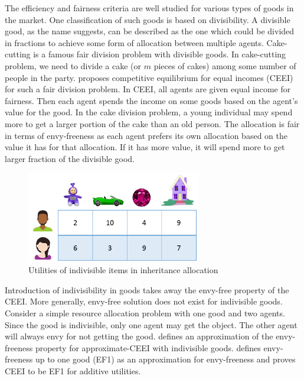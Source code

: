 The efficiency and fairness criteria are well studied for various types of goods in the market. One classification of such goods is based on divisibility. A divisible good, as the name suggests, can be described as the one which could be divided in fractions to achieve some form of allocation between multiple agents. Cake-cutting is a famous fair division problem with divisible goods. In cake-cutting problem, we need to divide a cake (or $m$ pieces of cakes) among some number of people in the party. \cite{varian1973equity} proposes competitive equilibrium for equal incomes (CEEI) for such a fair division problem. In CEEI, all agents are given equal income for fairness. Then each agent spends the income on some goods based on the agent's value for the good. In the cake division problem, a young individual may spend more to get a larger portion of the cake than an old person. The allocation is fair in terms of envy-freeness as each agent prefers its own allocation based on the value it has for that allocation. If it has more value, it will spend more to get larger fraction of the divisible good.

\begin{figure}
\includegraphics[width=3in]{images/indivisible_allocation2x4.png}
\caption{Utilities of indivisible items in inheritance allocation}
\end{figure}

Introduction of indivisibility in goods takes away the envy-free property of the CEEI. More generally, envy-free solution does not exist for indivisible goods. Consider a simple resource allocation problem with one good and two agents. Since the good is indivisible, only one agent may get the object. The other agent will always envy for not getting the good. \cite{budish2011combinatorial} defines an approximation of the envy-freeness property for approximate-CEEI with indivisible goods. \cite{budish2011combinatorial} defines envy-freeness up to one good (EF1) as an approximation for envy-freeness and proves CEEI to be EF1 for additive utilities.

